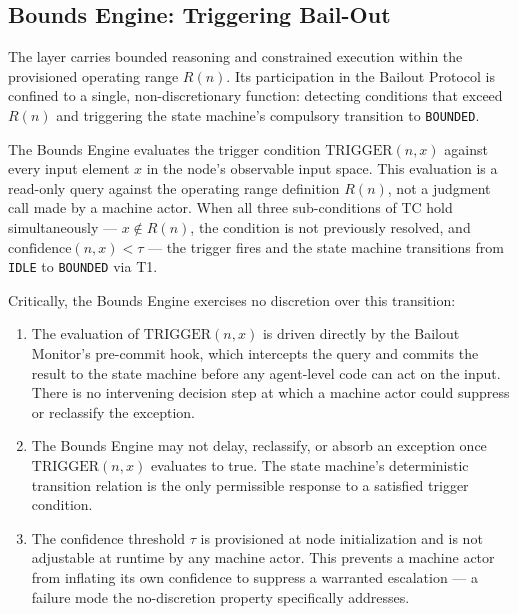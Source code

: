 \subsection{Bounds Engine: Triggering Bail-Out}\label{sec:bounds-trigger}

The \bounds{} layer carries bounded reasoning and constrained execution within the provisioned operating range $R(n)$. Its participation in the Bailout Protocol is confined to a single, non-discretionary function: detecting conditions that exceed $R(n)$ and triggering the state machine's compulsory transition to \texttt{BOUNDED}.

The Bounds Engine evaluates the trigger condition $\text{TRIGGER}(n, x)$ against every input element $x$ in the node's observable input space. This evaluation is a read-only query against the operating range definition $R(n)$, not a judgment call made by a machine actor. When all three sub-conditions of TC hold simultaneously — $x \notin R(n)$, the condition is not previously resolved, and $\text{confidence}(n, x) < \tau$ — the trigger fires and the state machine transitions from \texttt{IDLE} to \texttt{BOUNDED} via T1.

Critically, the Bounds Engine exercises no discretion over this transition:

\begin{enumerate}\itemsep=0pt
\item The evaluation of $\text{TRIGGER}(n, x)$ is driven directly by the Bailout Monitor's pre-commit hook, which intercepts the query and commits the result to the state machine before any agent-level code can act on the input. There is no intervening decision step at which a machine actor could suppress or reclassify the exception.

\item The Bounds Engine may not delay, reclassify, or absorb an exception once $\text{TRIGGER}(n, x)$ evaluates to true. The state machine's deterministic transition relation is the only permissible response to a satisfied trigger condition.

\item The confidence threshold $\tau$ is provisioned at node initialization and is not adjustable at runtime by any machine actor. This prevents a machine actor from inflating its own confidence to suppress a warranted escalation — a failure mode the no-discretion property specifically addresses.
\end{enumerate}

